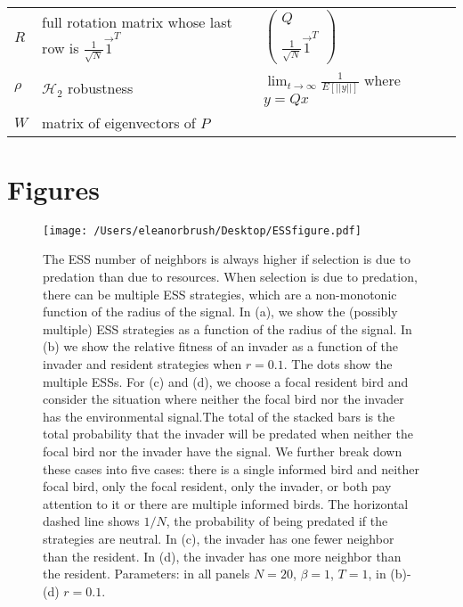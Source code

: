 \documentclass{article}
\begin{document}
\begin{table}
\begin{tabular}{@{}lllll@{}}
\\$R$ & full rotation matrix whose last row is $\frac{1}{\sqrt{N}}\vec{1}^T$ & $\left(\begin{array}{cc} Q \\ \frac{1}{\sqrt{N}}\vec{1}^T \end{array}\right)$
\\$\rho$ & $\mathscr{H}_2$ robustness & $\lim_{t\to\infty}\frac{1}{E[||y||]}$ where $y=Qx$
\\$W$ & matrix of eigenvectors of $P$
\end{tabular}
\end{table}

\newpage
\section{Figures }
\begin{figure}
\texttt{[image: /Users/eleanorbrush/Desktop/ESSfigure.pdf]}
\caption{\label{ESS} The ESS number of neighbors is always higher if selection is due to predation than due to resources. When selection is due to predation, there can be multiple ESS strategies, which are a non-monotonic function of the radius of the signal. In (a), we show the (possibly multiple) ESS strategies as a function of the radius of the signal. In (b) we show the relative fitness of an invader as a function of the invader and resident strategies when $r=0.1$. The dots show the multiple ESSs. For (c) and (d), we choose a focal resident bird and consider the situation where neither the focal bird nor the invader has the environmental signal.The total of the stacked bars is the total probability that the invader will be predated when neither the focal bird nor the invader have the signal.  We further break down these cases into five cases: there is a single informed bird and neither focal bird, only the focal resident, only the invader, or both pay attention to it or there are multiple informed birds. The horizontal dashed line shows $1/N$, the probability of being predated if the strategies are neutral. In (c), the invader has one fewer neighbor than the resident. In (d), the invader has one more neighbor than the resident. Parameters:  in all panels $N=20$, $\beta=1$, $T=1$, in (b)-(d) $r=0.1$. 
}
\end{figure}
\end{document}
